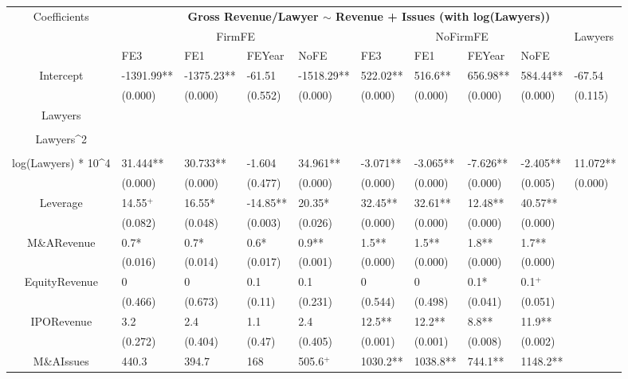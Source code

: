 \documentclass{article}
\begin{document}
\begin{table}[H]
\centering
\begin{tabular}{|clllllllll|}
\hline
\multirow{3}{*}{Coefficients} & \multicolumn{9}{c|}{\textbf{Gross Revenue/Lawyer $\sim$ Revenue + Issues (with log(Lawyers))}} \\
\cline{2-10}
& \multicolumn{4}{c}{FirmFE} & \multicolumn{4}{c}{NoFirmFE} & \multirow{2}{*}{Lawyers} \\
\cline{2-9}
& FE3 & FE1 & FEYear & NoFE & FE3 & FE1 & FEYear & NoFE &  \\
\hline
 
Intercept & -1391.99** & -1375.23** & -61.51 & -1518.29** & 522.02** & 516.6** & 656.98** & 584.44** & -67.54 \\ 
   & (0.000) & (0.000) & (0.552) & (0.000) & (0.000) & (0.000) & (0.000) & (0.000) & (0.115) \\ 
  Lawyers &  &  &  &  &  &  &  &  &  \\ 
   &  &  &  &  &  &  &  &  &  \\ 
  Lawyers^2 &  &  &  &  &  &  &  &  &  \\ 
   &  &  &  &  &  &  &  &  &  \\ 
  log(Lawyers) * 10^4 & 31.444** & 30.733** & -1.604 & 34.961** & -3.071** & -3.065** & -7.626** & -2.405** & 11.072** \\ 
   & (0.000) & (0.000) & (0.477) & (0.000) & (0.000) & (0.000) & (0.000) & (0.005) & (0.000) \\ 
  Leverage & 14.55$^{+}$ & 16.55* & -14.85** & 20.35* & 32.45** & 32.61** & 12.48** & 40.57** &  \\ 
   & (0.082) & (0.048) & (0.003) & (0.026) & (0.000) & (0.000) & (0.000) & (0.000) &  \\ 
  M\&ARevenue & 0.7* & 0.7* & 0.6* & 0.9** & 1.5** & 1.5** & 1.8** & 1.7** &  \\ 
   & (0.016) & (0.014) & (0.017) & (0.001) & (0.000) & (0.000) & (0.000) & (0.000) &  \\ 
  EquityRevenue & 0 & 0 & 0.1 & 0.1 & 0 & 0 & 0.1* & 0.1$^{+}$ &  \\ 
   & (0.466) & (0.673) & (0.11) & (0.231) & (0.544) & (0.498) & (0.041) & (0.051) &  \\ 
  IPORevenue & 3.2 & 2.4 & 1.1 & 2.4 & 12.5** & 12.2** & 8.8** & 11.9** &  \\ 
   & (0.272) & (0.404) & (0.47) & (0.405) & (0.001) & (0.001) & (0.008) & (0.002) &  \\ 
  M\&AIssues & 440.3 & 394.7 & 168 & 505.6$^{+}$ & 1030.2** & 1038.8** & 744.1** & 1148.2** &  \\ 

\end{tabular}
\end{table}
\end{document}
